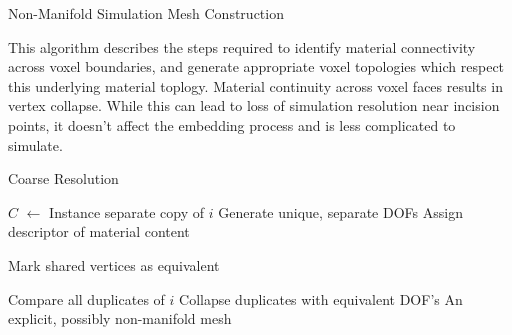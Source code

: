 \begin{algorithm}
  \caption{Non-Manifold Simulation Mesh Construction}{This algorithm
    describes the steps required to identify material connectivity
    across voxel boundaries, and generate appropriate voxel topologies
    which respect this underlying material toplogy. Material
    continuity across voxel faces results in vertex collapse. While
    this can lead to loss of simulation resolution near incision
    points, it doesn't affect the embedding process and is less
    complicated to simulate. }
\label{alg:NonmanifoldMeshGeneration}
\begin{algorithmic}[1]
\Require Coarse Resolution

     \State $C$ $\gets$ 
     \State Instance separate copy of $i$
     \State Generate unique, separate DOFs
     \State Assign descriptor of material content
  \EndFor
\EndFor

            \State Mark shared vertices as equivalent
         \EndIf
      \EndFor
   \EndFor

      \State Compare all duplicates of $i$
      \State Collapse duplicates with equivalent DOF's
   \EndFor
\EndFunction
\Ensure An explicit, possibly non-manifold mesh
\end{algorithmic}
\end{algorithm}

